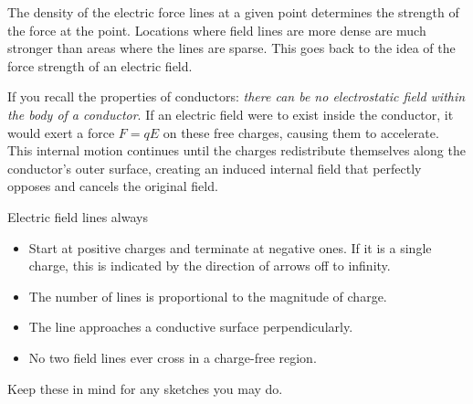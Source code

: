 The density of the electric force lines at a given point determines the strength of the force at the point. Locations where field lines are more dense are much stronger than areas where the lines are sparse. This goes back to the idea of the force strength of an electric field.


If you recall the properties of conductors: \textit{there can be no electrostatic field within the body of a conductor}. If an electric field were to exist inside the conductor, it would exert a force $F = qE$ on these free charges, causing them to accelerate. This internal motion continues until the charges redistribute themselves along the conductor's outer surface, creating an induced internal field that perfectly opposes and cancels the original field.

Electric field lines always
\begin{itemize}
	\item Start at positive charges and terminate at negative ones. If it is a single charge, this is indicated by the direction of arrows off to infinity.
	\item The number of lines is proportional to the magnitude of charge.
	\item The line approaches a conductive surface perpendicularly.
	\item No two field lines ever cross in a charge-free region.
\end{itemize}

Keep these in mind for any sketches you may do.
